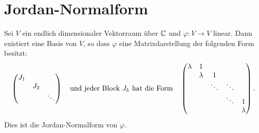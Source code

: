 \section{Jordan-Normalform}
\begin{theorem}
	Sei $V$ ein endlich dimensionaler Vektorraum über $\mathbb{C}$ und $\varphi: V \to  V$ linear.
	Dann existiert eine Basis von $V$, so dass $\varphi$ eine Matrixdarstellung der folgenden Form besitzt:
	\[
	\begin{pmatrix} 
		J_1\\
		&J_2\\
		& & \ddots
	\end{pmatrix} \qq{und jeder Block $J_{k}$ hat die Form} \begin{pmatrix} 
		\lambda &1\\
		&\lambda &1\\
		& & \ddots &\ddots\\
		& & & \ddots &1\\
		& & & &\lambda
	\end{pmatrix} 
	.\]
	Dies ist die Jordan-Normalform von $\varphi$.
\end{theorem}




















